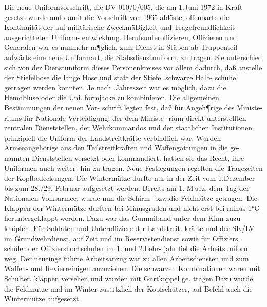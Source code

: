 

Die neue Uniformvorschrift, die DV 010/0/005, die
am 1.Juni 1972 in Kraft gesetzt wurde und damit
die Vorschrift von 1965 ablöste, offenbarte die Kontinuität der auf militärische ZweckmäBigkeit
und Tragefreundlichkeit ausgerichteten Uniform-
entwicklung.
Berufsunteroffizieren, Offizieren und Generalen
war es nunmehr m¶glich, zum Dienst in Stäben ab
Truppenteil aufwärts eine neue Uniformart, die
Stabsdienstuniform, zu tragen, Sie unterschied sich
von der Dienstuniform dieses Personenkreises vor
allem dadurch, daß anstelle der Stiefelhose die
lange Hose und statt der Stiefel schwarze Halb-
schuhe getragen werden konnten. Je nach .Jahreszeit
war es möglich, dazu die Hemdbluse oder die Uni.
formjacke zu kombinieren.
Die allgemeinen Bestimmungen der neuen Vor-
schrift legten fest, daß für Angeh¶rige des Ministe-
riums für Nationale Verteidigung, der dem Ministe-
rium direkt unterstellten zentralen Dienststellen,
der Wehrkommandos und der staatlichen Institutionen prinzipiell die Uniform der Landstreitkräfte
verbindlich war. Wurden Armeeangehörige aus den
Teilstreitkräften und Waffengattungen in die ge-
nannten Dienststellen versetzt oder kommandiert.
hatten sie das Recht, ihre Uniformen auch weiter-
hin zu tragen.
Neue Festlegungen regelten die Tragezeiten der
Kopfbedeckungen. Die Wintermütze durfte nur in
der Zeit vom 1.Dezember bis zum 28./29. Februar
aufgesetzt werden. Bereits am 1. M¤rz, dem Tag der
Nationalen Volksarmee, wurde nun die Schirm-
bzw,die Feldmütze getragen. Die Klappen der
Wintermütze durften bei Minusgraden und nicht
erst bei minus 1°G heruntergeklappt werden.
Dazu war das Gummiband unter dem Kinn zuzu
knöpfen.
Für Soldaten und Unteroffiziere der Landstreit.
kräfte und der SK/LV im Grundwehrdienst, auf
Zeit und im Reservistendienst sowie für Offiziers.
schüler der Offiziershochschulen im 1. und 2.Lehr-
jahr fiel die Arbeitsuniform weg. Der neueinge
führte Arbeitsanzug war zu allen Arbeitsdiensten
und zum Waffen- und Revierreinigen anzuziehen.
Die schwarzen Kombinationen waren mit Schulter.
klappen versehen und wurden mit Gurtkoppel ge.
tragen.Dazu wurde die Feldmütze und im Winter
zus¤tzlich der Kopfschützer, auf Befehl auch die
Wintermütze aufgesetzt.
